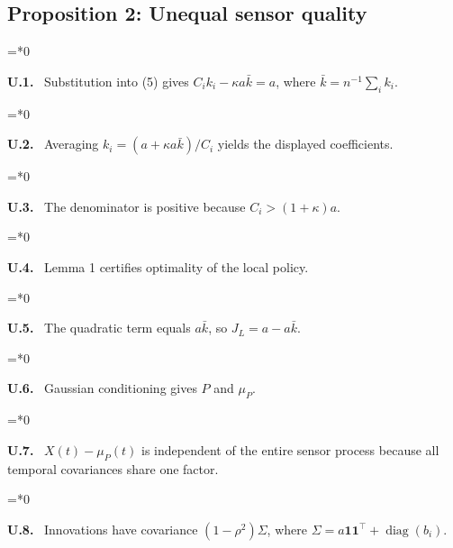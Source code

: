 \documentclass[11pt,letterpaper]{article}
\newenvironment{proofstep}[2]{%
  \begin{list}{}{\leftmargin=\dimexpr 0.17in*#2\relax%
  \setlength{\rightmargin}{0pt}\setlength{\topsep}{5pt}\setlength{\parsep}{2pt}}%
  \item[]\textbf{\textcolor{ink}{#1.}}\ }{\end{list}}
\begin{document}
\subsection{Proposition 2: Unequal sensor quality}
\begin{proofstep}{U.1}{0}
Substitution into (5) gives $C_i k_i-\kappa a\bar k=a$, where $\bar k=n^{-1}\sum_i k_i$.
\par\nopagebreak{}
\end{proofstep}
\begin{proofstep}{U.2}{0}
Averaging $k_i=(a+\kappa a\bar k)/C_i$ yields the displayed coefficients.
\par\nopagebreak{}
\end{proofstep}
\begin{proofstep}{U.3}{0}
The denominator is positive because $C_i>(1+\kappa)a$.
\par\nopagebreak{}
\end{proofstep}
\begin{proofstep}{U.4}{0}
Lemma 1 certifies optimality of the local policy.
\par\nopagebreak{}
\end{proofstep}
\begin{proofstep}{U.5}{0}
The quadratic term equals $a\bar k$, so $J_L=a-a\bar k$.
\par\nopagebreak{}
\end{proofstep}
\begin{proofstep}{U.6}{0}
Gaussian conditioning gives $P$ and $\mu_P$.
\par\nopagebreak{}
\end{proofstep}
\begin{proofstep}{U.7}{0}
$X(t)-\mu_P(t)$ is independent of the entire sensor process because all temporal covariances share one factor.
\par\nopagebreak{}
\end{proofstep}
\begin{proofstep}{U.8}{0}
Innovations have covariance $(1-\rho^2)\Sigma$, where $\Sigma=a\mathbf1\mathbf1^\top+\operatorname{diag}(b_i)$.
\par\nopagebreak{}
\end{proofstep}
\end{document}
